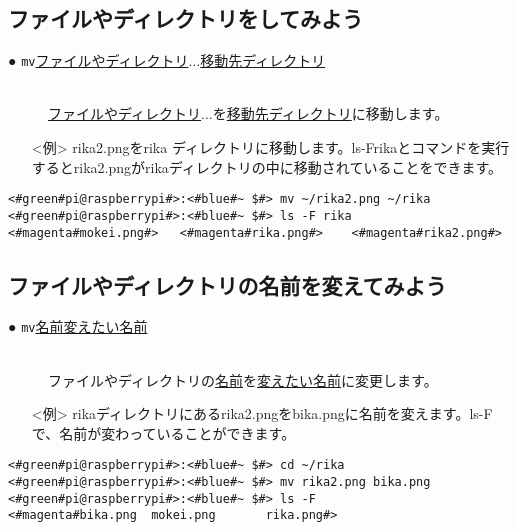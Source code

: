 \subsection{ファイルやディレクトリをしてみよう}
\begin{description}
\item[● \texttt{mv}\textvisiblespace \underline{ファイルやディレクトリ}$\ldots$\textvisiblespace \underline{移動先ディレクトリ}]\mbox{}\\
\underline{ファイルやディレクトリ}$\ldots$を\underline{移動先ディレクトリ}に移動します。
\end{description}
\begin{itemize}
\item[<例>]rika2.pngをrika ディレクトリに移動します。ls\textvisiblespace -F\textvisiblespace rikaとコマンドを実行するとrika2.pngがrikaディレクトリの中に移動されていることをできます。
\end{itemize}
\begin{lstlisting}[caption=mvの例, label=mv]
<#green#pi@raspberrypi#>:<#blue#~ $#> mv ~/rika2.png ~/rika
<#green#pi@raspberrypi#>:<#blue#~ $#> ls -F rika
<#magenta#mokei.png#>	<#magenta#rika.png#>	<#magenta#rika2.png#>
\end{lstlisting}


\subsection{ファイルやディレクトリの名前を変えてみよう}
\begin{description}
\item[● \texttt{mv}\textvisiblespace \underline{名前}\textvisiblespace \underline{変えたい名前}]\mbox{}\\
ファイルやディレクトリの\underline{名前}を\underline{変えたい名前}に変更します。
\end{description}
\begin{itemize}
\item[<例>]rikaディレクトリにあるrika2.pngをbika.pngに名前を変えます。ls\textvisiblespace -Fで、名前が変わっていることができます。
\end{itemize}
\begin{lstlisting}[caption=ファイル名を変える, label=mvName]
<#green#pi@raspberrypi#>:<#blue#~ $#> cd ~/rika
<#green#pi@raspberrypi#>:<#blue#~ $#> mv rika2.png bika.png
<#green#pi@raspberrypi#>:<#blue#~ $#> ls -F
<#magenta#bika.png	mokei.png		rika.png#>
\end{lstlisting}


